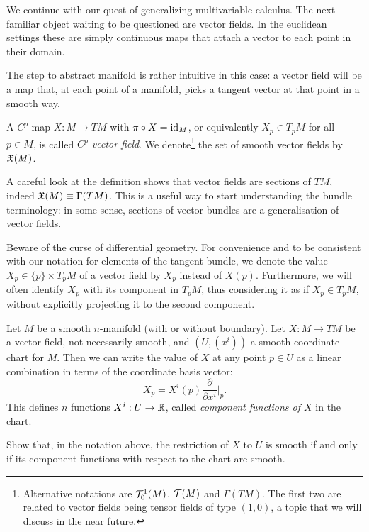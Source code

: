 We continue with our quest of generalizing multivariable calculus.
The next familiar object waiting to be questioned are vector fields.
In the euclidean settings these are simply continuous maps that attach a vector to each point in their domain.

The step to abstract manifold is rather intuitive in this case: a vector field will be a map that, at each point of a manifold, picks a tangent vector at that point in a smooth way.

\begin{definition}
  A $C^p$-map $X: M \to TM$ with $\pi\circ X = \operatorname{id}_M$, or equivalently $X_p\in T_pM$ for all $p\in M$, is called \emph{$C^p$-vector field}.
  We denote\footnote{Alternative notations are $\mathcal{T}_0^1(M)$, $\mathcal{T}(M)$ and $\Gamma(TM)$. The first two are related to vector fields being tensor fields of type $(1,0)$, a topic that we will discuss in the near future.} the set of smooth vector fields by $\mathfrak{X}(M)$.
\end{definition}

\begin{remark}
  A careful look at the definition shows that vector fields are sections of $TM$, indeed $\mathfrak{X}(M) \equiv \Gamma(TM)$.
  This is a useful way to start understanding the bundle terminology: in some sense, sections of vector bundles are a generalisation of vector fields.
\end{remark}

Beware of the curse of differential geometry.
For convenience and to be consistent with our notation for elements of the tangent bundle, we denote the value $X_p\in\{p\}\times T_p M$ of a vector field by $X_p$ instead of $X(p)$.
Furthermore, we will often identify $X_p$ with its component in $T_pM$, thus considering it as if $X_p\in T_pM$, without explicitly projecting it to the second component.

Let $M$ be a smooth $n$-manifold (with or without boundary).
Let $X:M\to TM$ be a vector field, not necessarily smooth, and $(U, (x^i))$ a smooth coordinate chart for $M$. Then we can write the value of $X$ at any point $p\in U$ as a linear combination in terms of the coordinate basis vector:
\begin{equation}\label{eq:vfCoordBAsis}
  X_p = X^i(p) \frac{\partial}{\partial x^i}\Big|_p.
\end{equation}
This defines $n$ functions $X^i: U\to\mathbb{R}$, called \emph{component functions of $X$} in the chart.

\begin{exercise}
  Show that, in the notation above, the restriction of $X$ to $U$ is smooth if and only if its component functions with respect to the chart are smooth.
\end{exercise}

